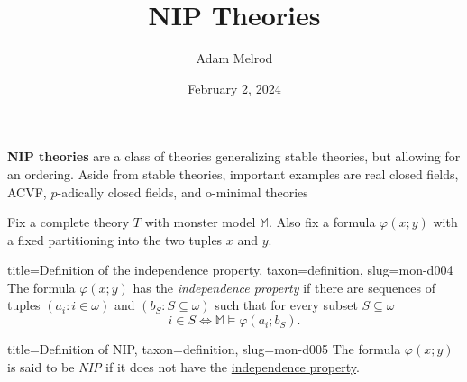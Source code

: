 \documentclass[a4paper]{article}
\title{NIP Theories}
\date{February 2, 2024}
\author{Adam Melrod}
\begin{document}
\maketitle
\par{\textbf{NIP theories} are a class of theories generalizing stable
theories, but allowing for an ordering. Aside from stable theories,
important examples are real closed fields, ACVF, \(p\)-adically closed
fields, and o-minimal theories}\par{Fix a complete theory \(T\) with monster model \(\mathbb {M}\).
Also fix a formula \(\varphi (x;y)\) with a fixed partitioning into
the two tuples \(x\) and \(y\).}
\begin{tree}{title={Definition of the independence property}, taxon={definition}, slug={mon-d004}}
The formula \(\varphi (x;y)\) has the \emph{independence property} if there
are sequences of tuples \((a_i : i  \in   \omega )\) and
\((b_S : S  \subseteq   \omega )\) such that for every subset \(S  \subseteq   \omega\)
\[i  \in  S  \Longleftrightarrow   \mathbb {M}  \models   \varphi (a_i; b_S).\]
\end{tree}

\begin{tree}{title={Definition of NIP}, taxon={definition}, slug={mon-d005}}
The formula \(\varphi (x;y)\) is said to be \emph{NIP} if it does not have
the \href{mon-0004}{independence property}.
\end{tree}
\end{document}
